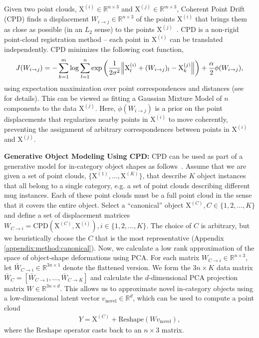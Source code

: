 \documentclass{article}
\newcommand{\pcx}[1]{\mathrm{X}^{(#1)}}
\newcommand{\wxy}[2]{W_{#1 \rightarrow #2}}
\newcommand{\bwxy}[2]{\bar{W}_{#1 \rightarrow #2}}
\newcommand{\pci}{\pcx{i}}
\newcommand{\pcj}{\pcx{j}}
\newcommand{\pcc}{\pcx{C}}
\newcommand{\wij}{\wxy{i}{j}}
\begin{document}
Given two point clouds, $\pci \in \mathbb{R}^{n \times 3}$ and $\pcj \in \mathbb{R}^{m \times 3}$, Coherent Point Drift (CPD) finds a displacement $\wij  \in \mathbb{R}^{n \times 3}$ of the points $\pci$ that brings them as close as possible (in an $L_2$ sense) to the points $\pcj$~\cite{myronenko2010point}. CPD is a non-rigid point-cloud registration method -- each point in $\pci$ can be translated independently. CPD minimizes the following cost function,
\begin{align} %
    J(\wij) = - \sum_{k=1}^{m} \log \sum_{l=1}^{n} \exp \left( \frac{1}{2 \sigma^2} \norm{\pci_l + (W_{i \rightarrow j})_l - \pcj_k } \right) + \frac{\alpha}{2} \phi(\wij),
\end{align}
using expectation maximization over point correspondences and distances (see~\cite{myronenko2010point} for details). This can be viewed as fitting a Gaussian Mixture Model of $n$ components to the data $\pcj$. Here, $\phi(\wij)$ is a prior on the point displacements that regularizes nearby points in $\pci$ to move coherently, preventing the assignment of arbitrary correspondences between points in $\pci$ and $\pcj$.

\textbf{Generative Object Modeling Using CPD:} CPD can be used as part of a generative model for in-category object shapes as follows~\cite{rodriguez18transferring}. Assume that we are given a set of point clouds, $\{\pcx{1}, \dots, \pcx{K}\}$, that describe $K$ object instances that all belong to a single category, e.g. a set of point clouds describing different mug instances. Each of these point clouds must be a full point cloud in the sense that it covers the entire object. Select a ``canonical'' object $\pcx{C}, C \in \{1,2, ..., K\}$ and define a set of displacement matrices $\wxy{C}{i} = \mathrm{CPD}(\pcx{C}, \pcx{i}), i \in \{1, 2, ..., K\}$. The choice of $C$ is arbitrary, but we heuristically choose the $C$ that is the most representative (Appendix \ref{appendix:method:canonical}). Now, we calculate a low rank approximation of the space of object-shape deformations using PCA. For each matrix $\wxy{C}{i} \in \mathbb{R}^{n \times 3}$, let $\bwxy{C}{i} \in \mathbb{R}^{3n \times 1}$ denote the flattened version. We form the $3n \times K$ data matrix $\bar{W}_C = \left[\bwxy{C}{1}, \dots, \bwxy{C}{K}\right]$ and calculate the $d$-dimensional PCA projection matrix $W \in \mathbb{R}^{3n \times d}$. This allows us to approximate novel in-category objects using a low-dimensional latent vector $v_{\mathrm{novel}} \in \mathbb{R}^d$, which can be used to compute a point cloud
\begin{align}
Y = \pcc + \mathrm{Reshape}(W v_{\mathrm{novel}}),
\label{eq:background:warp}
\end{align}
where the $\mathrm{Reshape}$ operator casts back to an $n \times 3$ matrix.
\end{document}
